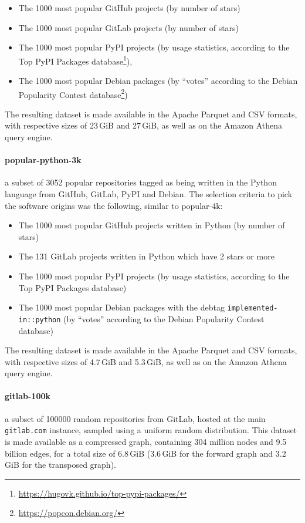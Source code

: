 \begin{itemize}
    \setlength\itemsep{0em}
    \item The 1000 most popular GitHub projects (by number of stars)
    \item The 1000 most popular GitLab projects (by number of stars)
    \item The 1000 most popular PyPI projects (by usage statistics, according
        to the Top PyPI Packages
        database\footnote{\url{https://hugovk.github.io/top-pypi-packages/}}),
    \item The 1000 most popular Debian packages (by “votes” according to the
        Debian Popularity Contest
        database\footnote{\url{https://popcon.debian.org/}})
\end{itemize}

The resulting dataset is made available in the Apache Parquet and CSV formats,
with respective sizes of 23\,GiB and 27\,GiB, as well as on the Amazon Athena
query engine.

\paragraph{popular-python-3k} a subset of 3052 popular repositories tagged as
being written in the Python language from GitHub, GitLab, PyPI and Debian. The
selection criteria to pick the software origins was the following, similar to
popular-4k:

\begin{itemize}
    \setlength\itemsep{0em}
    \item The 1000 most popular GitHub projects written in Python (by number of
        stars)
    \item The 131 GitLab projects written in Python which have 2 stars or more
    \item The 1000 most popular PyPI projects (by usage statistics, according
        to the Top PyPI Packages database)
    \item The 1000 most popular Debian packages with the debtag
        \texttt{implemented-in::python} (by “votes” according to the Debian
        Popularity Contest database)
\end{itemize}

The resulting dataset is made available in the Apache Parquet and CSV formats,
with respective sizes of 4.7\,GiB and 5.3\,GiB, as well as on the Amazon Athena
query engine.

\paragraph{gitlab-100k} a subset of \num{100000} random repositories from
GitLab, hosted at the main \texttt{gitlab.com} instance, sampled using a
uniform random distribution. This dataset is made available as a compressed
graph, containing 304 million nodes and 9.5 billion edges, for a total size of
6.8\,GiB (3.6\,GiB for the forward graph and 3.2\,GiB for the transposed
graph).

